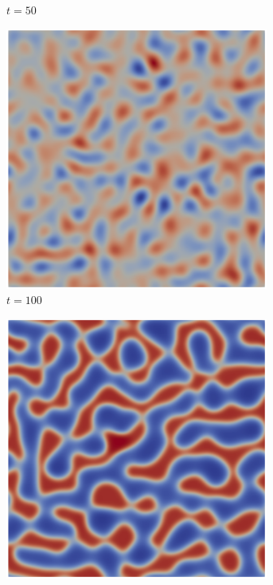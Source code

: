 \begin{figure}[htb]
\begin{subfigure}[t]{0.45\textwidth}
        \caption{$t = 50$}
    \end{subfigure}
    \begin{subfigure}[t]{0.45\textwidth}
        \centering
        \includegraphics[width=0.95\textwidth]{Imagenes/Maxwell2D/Maxwell2D_sim/Imagenes/t_100}
        \caption{$t = 100$}
    \end{subfigure}    
    \begin{subfigure}[t]{0.45\textwidth}
        \centering
        \includegraphics[width=0.95\textwidth]{Imagenes/Maxwell2D/Maxwell2D_sim/Imagenes/t_500}

\end{subfigure}
\end{figure}

